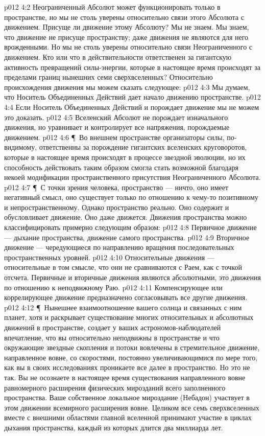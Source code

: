\vs p012 4:2 Неограниченный Абсолют может функционировать только в пространстве, но мы не столь уверены относительно связи этого Абсолюта с движением. Присуще ли движение этому Абсолюту? Мы не знаем. Мы знаем, что движение не присуще пространству; даже движения  не являются для него врожденными. Но мы не столь уверены относительно связи Неограниченного с движением. Кто или что в действительности ответственен за гигантскую активность превращений силы\hyp{}энергии, которые в настоящее время происходят за пределами границ нынешних семи сверхвселенных? Относительно происхождения движения мы можем сказать следующее:
\vs p012 4:3 \bibnobreakspace Мы думаем, что Носитель Объединенных Действий дает начало движению  пространстве.
\vs p012 4:4 \bibnobreakspace Если Носитель Объединенных Действий и порождает движение  мы не можем это доказать.
\vs p012 4:5 \bibnobreakspace Вселенский Абсолют не порождает изначального движения, но уравнивает и контролирует все напряжения, порождаемые движением.
\vs p012 4:6 \P\ Во внешнем пространстве организаторы силы, по\hyp{}видимому, ответственны за порождение гигантских вселенских круговоротов, которые в настоящее время происходят в процессе звездной эволюции, но их способность действовать таким образом смогла стать возможной благодаря некоей модификации пространственного присутствия Неограниченного Абсолюта.
\vs p012 4:7 \P\ С точки зрения человека, пространство --- ничто, оно имеет негативный смысл, оно существует только по отношению к чему\hyp{}то позитивному и непространственному. Однако пространство реально. Оно содержит и обусловливает движение. Оно даже движется. Движения пространства можно классифицировать примерно следующим образом:
\vs p012 4:8 \bibnobreakspace Первичное движение --- дыхание пространства, движение самого пространства.
\vs p012 4:9 \bibnobreakspace Вторичное движение --- чередующиеся по направлению вращения последовательных пространственных уровней.
\vs p012 4:10 \bibnobreakspace Относительные движения --- относительные в том смысле, что они не сравниваются с Раем, как с точкой отсчета. Первичные и вторичные движения являются абсолютными, это движения по отношению к неподвижному Раю.
\vs p012 4:11 \bibnobreakspace Компенсирующее или коррелирующее движение предназначено согласовывать все другие движения.
\vs p012 4:12 \P\ Нынешнее взаимоотношение вашего солнца и связанных с ним планет, хотя и раскрывает существование многих относительных и абсолютных движений в пространстве, создает у ваших астрономов\hyp{}наблюдателей впечатление, что вы относительно неподвижны в пространстве и что окружающие звездные скопления и потоки вовлечены в стремительное движение, направленное вовне, со скоростями, постоянно увеличивающимися по мере того, как вы в своих исследованиях проникаете все далее в пространство. Но это не так. Вы не осознаете в настоящее время существования направленного вовне равномерного расширения физических мирозданий всего заполненного пространства. Ваше собственное локальное мироздание (Небадон) участвует в этом движении всемирного расширения вовне. Целиком все семь сверхвселенных вместе с внешними областями главной вселенной принимают участие в циклах дыхания пространства, каждый из которых длится два миллиарда лет.
